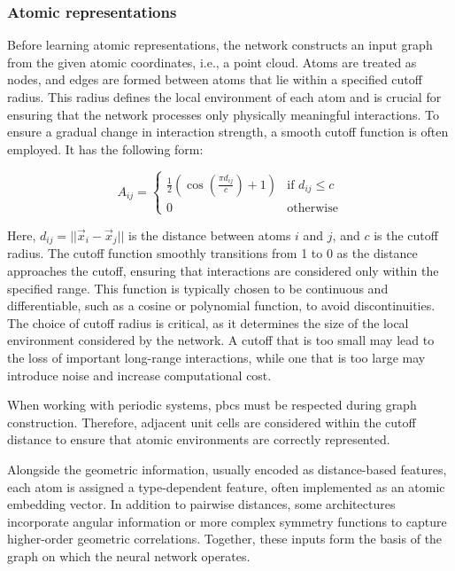 \subsubsection{Atomic representations}
Before learning atomic representations, the network constructs an input graph from the given atomic coordinates, i.e., a point cloud. Atoms are treated as nodes, and edges are formed between atoms that lie within a specified cutoff radius. This radius defines the local environment of each atom and is crucial for ensuring that the network processes only physically meaningful interactions. To ensure a gradual change in interaction strength, a smooth cutoff function is often employed. It has the following form:

\begin{equation}
    A_{ij} = \begin{cases}
    \frac{1}{2}\left(\cos\left(\frac{\pi d_{ij}}{c}\right) + 1\right) & \text{if } d_{ij} \leq c \\
    0 & \text{otherwise}
    \end{cases}
    \label{eq:smooth_cutoff}
\end{equation}

Here, $d_{ij} = ||\vec{x}_i - \vec{x}_j||$ is the distance between atoms $i$ and $j$, and $c$ is the cutoff radius. The cutoff function smoothly transitions from 1 to 0 as the distance approaches the cutoff, ensuring that interactions are considered only within the specified range. This function is typically chosen to be continuous and differentiable, such as a cosine or polynomial function, to avoid discontinuities. The choice of cutoff radius is critical, as it determines the size of the local environment considered by the network. A cutoff that is too small may lead to the loss of important long-range interactions, while one that is too large may introduce noise and increase computational cost.

When working with periodic systems, \acp{pbc} must be respected during graph construction. Therefore, adjacent unit cells are considered within the cutoff distance to ensure that atomic environments are correctly represented.

Alongside the geometric information, usually encoded as distance-based features, each atom is assigned a type-dependent feature, often implemented as an atomic embedding vector. In addition to pairwise distances, some architectures incorporate angular information or more complex symmetry functions to capture higher-order geometric correlations. Together, these inputs form the basis of the graph on which the neural network operates.

